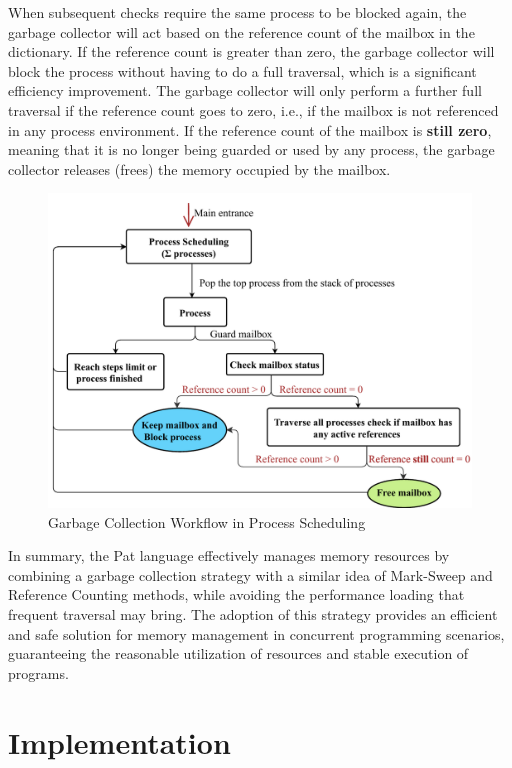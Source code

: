 \documentclass{l4proj}
\begin{document}
When subsequent checks require the same process to be blocked again, the garbage collector will act based on the reference count of the mailbox in the dictionary. If the reference count is greater than zero, the garbage collector will block the process without having to do a full traversal, which is a significant efficiency improvement. The garbage collector will only perform a further full traversal if the reference count goes to zero, i.e., if the mailbox is not referenced in any process environment. If the reference count of the mailbox is \textbf{still zero}, meaning that it is no longer being guarded or used by any process, the garbage collector releases (frees) the memory occupied by the mailbox.


\begin{figure}[h]
    \centering
    \includegraphics[width=0.8\linewidth]{dissertation/images/gc.pdf}    
    \caption{ 
    Garbage Collection Workflow in Process Scheduling
    }
    \label{fig:gc1} 
\end{figure}

In summary, the Pat language effectively manages memory resources by combining a garbage collection strategy with a similar idea of Mark-Sweep and Reference Counting methods, while avoiding the performance loading that frequent traversal may bring. The adoption of this strategy provides an efficient and safe solution for memory management in concurrent programming scenarios, guaranteeing the reasonable utilization of resources and stable execution of programs.




\chapter{Implementation}
\end{document}
